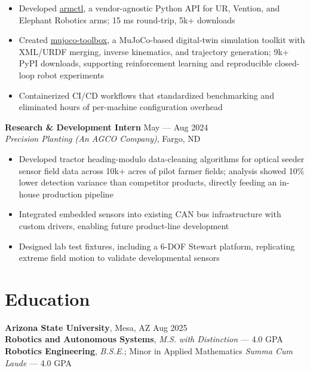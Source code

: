 \documentclass[10pt]{article}
\begin{document}
\begin{itemize}
  \item Developed \href{https://github.com/MGross21/armctl}{armctl}, a vendor-agnostic Python API for UR, Vention, and Elephant Robotics arms; 15 ms round-trip, 5k+ downloads
  \item Created \href{https://github.com/MGross21/mujoco-toolbox}{mujoco-toolbox}, a MuJoCo-based digital-twin simulation toolkit with XML/URDF merging, inverse kinematics, and trajectory generation; 9k+ PyPI downloads, supporting reinforcement learning and reproducible closed-loop robot experiments
  \item Containerized CI/CD workflows that standardized benchmarking and eliminated hours of per-machine configuration overhead
\end{itemize}
\vspace{0.5em}
\textbf{Research \& Development Intern} \hfill May --- Aug 2024 \\
\textit{Precision Planting (An AGCO Company)}, Fargo, ND
\begin{itemize}
  \item Developed tractor heading-modulo data-cleaning algorithms for optical seeder sensor field data across 10k+ acres of pilot farmer fields; analysis showed 10\% lower detection variance than competitor products, directly feeding an in-house production pipeline
  \item Integrated embedded sensors into existing CAN bus infrastructure with custom drivers, enabling future product-line development
  \item Designed lab test fixtures, including a 6-DOF Stewart platform, replicating extreme field motion to validate developmental sensors
\end{itemize}
\section*{Education}
\textbf{Arizona State University}, Mesa, AZ \hfill Aug 2025 \\
\textbf{Robotics and Autonomous Systems}, \textit{M.S.} \hfill \textit{with Distinction} --- 4.0 GPA \\
\textbf{Robotics Engineering}, \textit{B.S.E.}; Minor in Applied Mathematics \hfill \textit{Summa Cum Laude} --- 4.0 GPA
\end{document}
